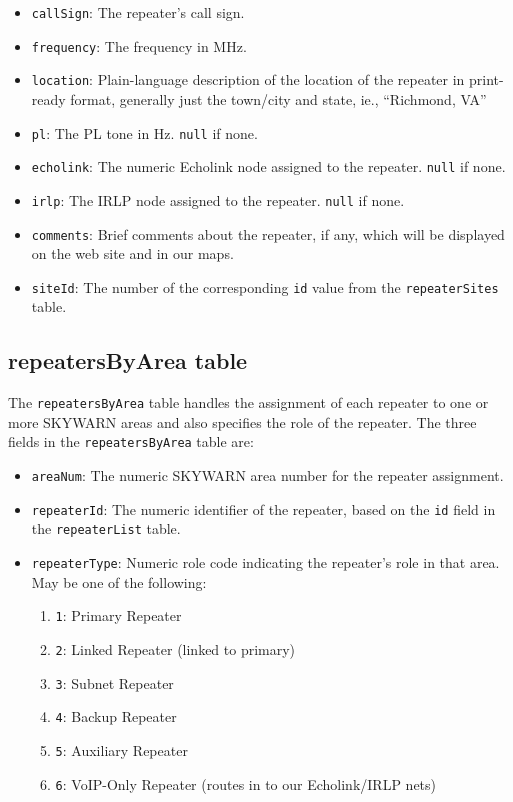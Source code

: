 \documentclass[pdflatex,letterpaper,twoside,12pt]{book}
\begin{document}
\begin{itemize}
\item \texttt{callSign}:  The repeater's call sign.
\item \texttt{frequency}:  The frequency in MHz.
\item \texttt{location}:  Plain-language description of the location of the repeater in print-ready format, generally just the town/city and state, ie., ``Richmond, VA''
\item \texttt{pl}:  The PL tone in Hz.  \texttt{null} if none.
\item \texttt{echolink}:  The numeric Echolink node assigned to the repeater.  \texttt{null} if none.
\item \texttt{irlp}:  The IRLP node assigned to the repeater.  \texttt{null} if none.
\item \texttt{comments}:  Brief comments about the repeater, if any, which will be displayed on the web site and in our maps.
\item \texttt{siteId}:  The number of the corresponding \texttt{id} value from the \texttt{repeaterSites} table.
\end{itemize}

\subsection{repeatersByArea table}

The \texttt{repeatersByArea} table handles the assignment of each repeater to one or more SKYWARN areas and also specifies the role of the repeater.  The three fields in the \texttt{repeatersByArea} table are:

\begin{itemize}
\item \texttt{areaNum}:  The numeric SKYWARN area number for the repeater assignment.
\item \texttt{repeaterId}:  The numeric identifier of the repeater, based on the \texttt{id} field in the \texttt{repeaterList} table.
\item \texttt{repeaterType}: Numeric role code indicating the repeater's role in that area. May be one of the following:
	\begin{enumerate}
	\item \texttt{1}: Primary Repeater
	\item \texttt{2}: Linked Repeater (linked to primary)
	\item \texttt{3}: Subnet Repeater
	\item \texttt{4}: Backup Repeater
	\item \texttt{5}: Auxiliary Repeater
	\item \texttt{6}: VoIP-Only Repeater (routes in to our Echolink/IRLP nets)
	\end{enumerate}
\end{itemize}
\end{document}
